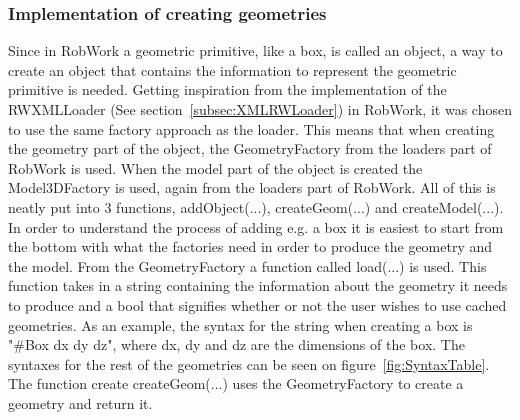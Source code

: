 \subsubsection{Implementation of creating geometries}
Since in RobWork a geometric primitive, like a box, is called an object, a way to create an object that contains the information to represent the geometric primitive is needed. Getting inspiration from the implementation of the RWXMLLoader (See section~\ref{subsec:XMLRWLoader}) in RobWork, it was chosen to use the same factory approach as the loader. This means that when creating the geometry part of the object, the GeometryFactory from the loaders part of RobWork is used. When the model part of the object is created the Model3DFactory is used, again from the loaders part of RobWork. All of this is neatly put into 3 functions, addObject(...), createGeom(...) and createModel(...).\\

In order to understand the process of adding e.g. a box it is easiest to start from the bottom with what the factories need in order to produce the geometry and the model. From the GeometryFactory a function called load(...) is used. This function takes in a string containing the information about the geometry it needs to produce and a bool that signifies whether or not the user wishes to use cached geometries. As an example, the syntax for the string when creating a box is "\#Box dx dy dz", where dx, dy and dz are the dimensions of the box. The syntaxes for the rest of the geometries can be seen on figure~\ref{fig:SyntaxTable}. The function create createGeom(...) uses the GeometryFactory to create a geometry and return it.\\


